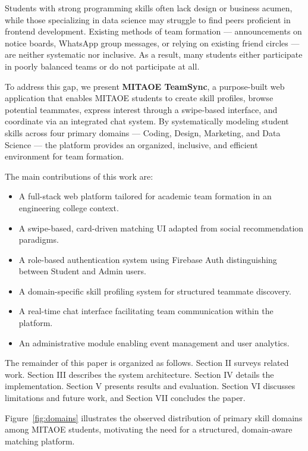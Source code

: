 \documentclass[conference]{IEEEtran}
\begin{document}
Students with strong programming skills often lack design or business acumen, while those specializing in data science may struggle to find peers proficient in frontend development. Existing methods of team formation --- announcements on notice boards, WhatsApp group messages, or relying on existing friend circles --- are neither systematic nor inclusive. As a result, many students either participate in poorly balanced teams or do not participate at all.

To address this gap, we present \textbf{MITAOE TeamSync}, a purpose-built web application that enables MITAOE students to create skill profiles, browse potential teammates, express interest through a swipe-based interface, and coordinate via an integrated chat system. By systematically modeling student skills across four primary domains --- Coding, Design, Marketing, and Data Science --- the platform provides an organized, inclusive, and efficient environment for team formation.

The main contributions of this work are:
\begin{itemize}
    \item A full-stack web platform tailored for academic team formation in an engineering college context.
    \item A swipe-based, card-driven matching UI adapted from social recommendation paradigms.
    \item A role-based authentication system using Firebase Auth distinguishing between Student and Admin users.
    \item A domain-specific skill profiling system for structured teammate discovery.
    \item A real-time chat interface facilitating team communication within the platform.
    \item An administrative module enabling event management and user analytics.
\end{itemize}

The remainder of this paper is organized as follows. Section II surveys related work. Section III describes the system architecture. Section IV details the implementation. Section V presents results and evaluation. Section VI discusses limitations and future work, and Section VII concludes the paper.

Figure~\ref{fig:domains} illustrates the observed distribution of primary skill domains among MITAOE students, motivating the need for a structured, domain-aware matching platform.
\end{document}
